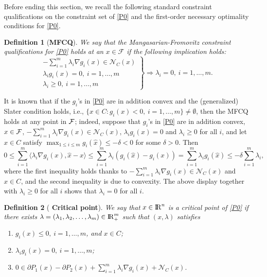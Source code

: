 \documentclass[10pt]{article}
\numberwithin{equation}{section}
\newtheorem{definition}{Definition}[section]
\def\R{{\rm I\!R}}
\begin{document}
Before ending this section, we recall the following standard constraint qualifications on the constraint set of \eqref{P0} and the first-order necessary optimality conditions for \eqref{P0}.
\begin{definition}[{{\bf MFCQ}}]\label{MFCQ1}
We say that the Mangasarian-Fromovitz constraint qualifications for \eqref{P0} holds at an $x\in \mathcal{F}$ if the following implication holds:
\[
\left.\begin{matrix}
-\sum\limits_{i=1}^m\lambda_i \nabla g_i(x)\in \mathcal{N}_C(x)\\
\lambda_ig_i(x) =0, ~ i = 1, \ldots, m\\
\lambda_i\geq 0, ~ i = 1, \ldots, m
\end{matrix}\right\} \Rightarrow\lambda_i =0, ~ i = 1,\ldots, m.
\]
\end{definition}
{\color{blue} It is known that if the $g_i$'s in \eqref{P0} are in addition convex and the (generalized) Slater condition holds, i.e., $\{x \in C: g_i(x) < 0, ~ i = 1, \ldots, m\} \neq \emptyset $, then the MFCQ holds at any point in ${\cal F}$; indeed, suppose that $g_i$'s in \eqref{P0} are in addition convex, $x\in {\cal F}$, $-\sum\limits_{i=1}^m\lambda_i \nabla g_i(x)\in \mathcal{N}_C(x)$, $\lambda_ig_i(x) =0$ and
$\lambda_i\geq 0$ for all $i$, and let $\hat x\in C$ satisfy $\max_{1\le i\le m}g_i(\hat x) \le -\delta < 0$ for some $\delta > 0$. Then
\[
0 \le \sum_{i=1}^m\langle \lambda_i \nabla g_i(x), \hat x - x\rangle\le \sum_{i=1}^m\lambda_i(g_i(\hat x) - g_i(x)) = \sum_{i=1}^m\lambda_ig_i(\hat x)\le -\delta\sum_{i=1}^m\lambda_i,
\]
where the first inequality holds thanks to $-\sum\limits_{i=1}^m\lambda_i \nabla g_i(x)\in \mathcal{N}_C(x)$ and $\hat x\in C$, and the second inequality is due to convexity.
The above display together with $\lambda_i \ge 0$ for all $i$ shows that $\lambda_i = 0$ for all $i$.
}
\begin{definition}[{{\bf {\color{blue} Critical point}}}]\label{Stationary}
We say that $x\in\R^n$ is a {\color{blue}critical point} of \eqref{P0} if there exists $\lambda = (\lambda_1, \lambda_2, \ldots, \lambda_m)\in\R_+^m$ such that $(x,\lambda)$ satisfies
 \begin{enumerate}[{\rm (i)}]
   \item $g_i(x) \leq 0, ~ i = 1, \ldots, m$, and $x\in C$;
   \item $\lambda_ig_i(x)=0, ~ i = 1, \ldots, m$;
   \item $0\in\partial P_1(x) - \partial P_2(x) + \sum\limits_{i=1}^m\lambda_i \nabla g_i(x) + \mathcal{N}_C(x)$.
 \end{enumerate}
\end{definition}
\end{document}
